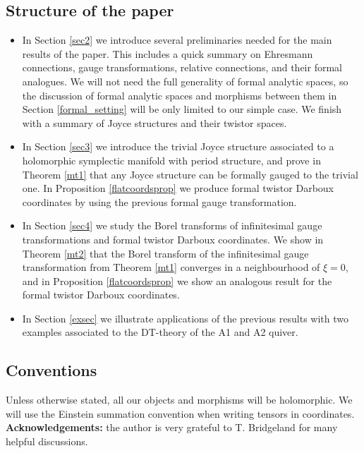 \documentclass{article}
\theoremstyle{definition}
\numberwithin{equation}{section}
\begin{document}
\subsection{Structure of the paper}
\begin{itemize}
    \item In Section \ref{sec2} we introduce several preliminaries needed for the main results of the paper. This includes a quick summary on Ehresmann connections, gauge transformations, relative connections, and their formal analogues. We will not need the full generality of formal analytic spaces, so the discussion of formal analytic spaces and morphisms between them in Section \ref{formal_setting} will be only limited to our simple case. We finish with a summary of Joyce structures and their twistor spaces. 
    \item In Section \ref{sec3} we introduce the trivial Joyce structure associated to a holomorphic symplectic manifold with period structure, and prove  in Theorem \ref{mt1} that any Joyce structure can be formally gauged to the trivial one. In Proposition \ref{flatcoordsprop} we produce formal twistor Darboux coordinates by using the previous formal gauge transformation.  
    \item In Section \ref{sec4} we study the Borel transforms of infinitesimal gauge transformations and formal twistor Darboux coordinates. We show in Theorem \ref{mt2} that the Borel transform of the infinitesimal gauge transformation from Theorem \ref{mt1} converges in a neighbourhood of $\xi=0$, and in Proposition \ref{flatcoordsprop} we show an analogous result for the formal twistor Darboux coordinates. 
    \item In Section \ref{exsec} we illustrate applications of the previous results with two examples associated to the DT-theory of the A1 and A2 quiver.  
\end{itemize}

\subsection{Conventions}

Unless otherwise stated, all our objects and morphisms will be holomorphic. We will use the Einstein summation convention when writing tensors in coordinates. \\

\textbf{Acknowledgements:} the author is very grateful to T. Bridgeland for many helpful discussions.
\end{document}
